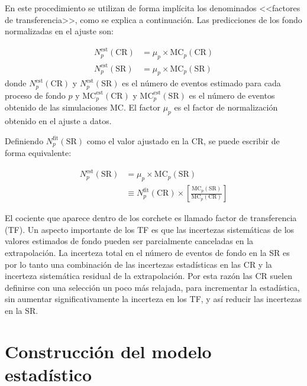 En este procedimiento se utilizan de forma implícita los
denominados <<factores de transferencia>>, como se explica a continuación.
Las predicciones de los fondo normalizadas en el ajuste son:

\begin{align}
  N_p^{\text{est}}(\text{CR}) &= \mu_p \times \text{MC}_p (\text{CR})
  \\ N_p^{\text{est}}(\text{SR}) &= \mu_p \times \text{MC}_p (\text{SR})
\end{align}
%
donde $N_p^{\text{est}}(\text{CR})$ y $N_p^{\text{est}}(\text{SR})$ es el número
de eventos estimado para cada proceso de fondo $p$ y
$\text{MC}_p^{\text{est}}(\text{CR})$ y $\text{MC}_p^{\text{est}}(\text{SR})$ es
el número de eventos obtenido de las simulaciones MC. El factor $\mu_p$ es el
factor de normalización obtenido en el ajuste a datos.

Definiendo $N_p^\text{fit}(\text{SR})$ como el valor ajustado en la CR, se puede
escribir de forma equivalente:

\begin{align}
  N_p^\text{est}(\text{SR}) &= \mu_p \times \text{MC}_p (\text{SR}) \nonumber \\
  &\equiv N_p^\text{fit}(\text{CR}) \times \left[ \frac{\text{MC}_p(\text{SR})}{\text{MC}_p(\text{CR})} \right]
\end{align}

El cociente que aparece dentro de los corchete es llamado factor de
transferencia (TF). Un aspecto importante de los TF es que las incertezas
sistemáticas de los valores estimados de fondo pueden ser parcialmente
canceladas en la extrapolación. La incerteza total en el número de eventos de
fondo en la SR es por lo tanto una combinación de las incertezas estadísticas en
las CR y la incerteza sistemática residual de la extrapolación. Por esta razón
las CR suelen definirse con una selección un poco más relajada, para incrementar
la estadística, sin aumentar significativamente la incerteza en los TF, y así
reducir las incertezas en la SR.


\section{Construcción del modelo estadístico}


